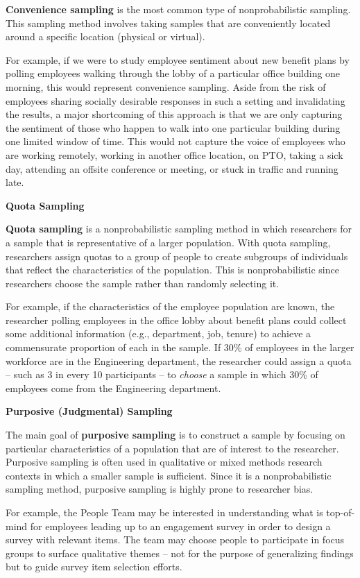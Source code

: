 \documentclass[]{book}
\begin{document}
\textbf{Convenience sampling} is the most common type of nonprobabilistic sampling. This sampling method involves taking samples that are conveniently located around a specific location (physical or virtual).

For example, if we were to study employee sentiment about new benefit plans by polling employees walking through the lobby of a particular office building one morning, this would represent convenience sampling. Aside from the risk of employees sharing socially desirable responses in such a setting and invalidating the results, a major shortcoming of this approach is that we are only capturing the sentiment of those who happen to walk into one particular building during one limited window of time. This would not capture the voice of employees who are working remotely, working in another office location, on PTO, taking a sick day, attending an offsite conference or meeting, or stuck in traffic and running late.

\textbf{Quota Sampling}

\textbf{Quota sampling} is a nonprobabilistic sampling method in which researchers for a sample that is representative of a larger population. With quota sampling, researchers assign quotas to a group of people to create subgroups of individuals that reflect the characteristics of the population. This is nonprobabilistic since researchers choose the sample rather than randomly selecting it.

For example, if the characteristics of the employee population are known, the researcher polling employees in the office lobby about benefit plans could collect some additional information (e.g., department, job, tenure) to achieve a commensurate proportion of each in the sample. If 30\% of employees in the larger workforce are in the Engineering department, the researcher could assign a quota -- such as 3 in every 10 participants -- to \emph{choose} a sample in which 30\% of employees come from the Engineering department.

\textbf{Purposive (Judgmental) Sampling}

The main goal of \textbf{purposive sampling} is to construct a sample by focusing on particular characteristics of a population that are of interest to the researcher. Purposive sampling is often used in qualitative or mixed methods research contexts in which a smaller sample is sufficient. Since it is a nonprobabilistic sampling method, purposive sampling is highly prone to researcher bias.

For example, the People Team may be interested in understanding what is top-of-mind for employees leading up to an engagement survey in order to design a survey with relevant items. The team may choose people to participate in focus groups to surface qualitative themes -- not for the purpose of generalizing findings but to guide survey item selection efforts.
\end{document}
